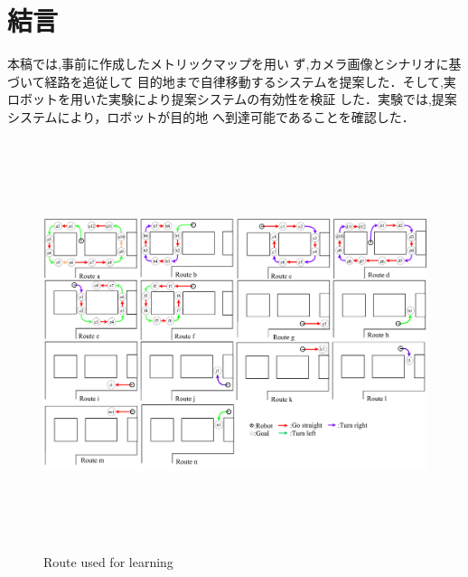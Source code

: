 \documentclass{sice-si}
\begin{document}
\section{結言}
本稿では,事前に作成したメトリックマップを用い
ず,カメラ画像とシナリオに基づいて経路を追従して
目的地まで自律移動するシステムを提案した．そして,実
ロボットを用いた実験により提案システムの有効性を検証
した．実験では,提案システムにより，ロボットが目的地
へ到達可能であることを確認した．
\printbibliography[title=参考文献]
\begin{figure}[htbp]
    \centering
     \includegraphics[height=120mm]{./figs/newroute.pdf}
     \caption{Route used for learning}\label{fig:newroute}
\end{figure}
\end{document}
